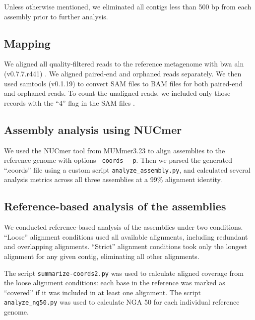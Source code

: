 \documentclass[11pt]{article}
\begin{document}
Unless otherwise mentioned, we eliminated all contigs less than 500 bp
from each assembly prior to further analysis.

\subsection*{Mapping}

We aligned all quality-filtered reads to the reference metagenome with
bwa aln (v0.7.7.r441) \cite{bwa}. We aligned paired-end and orphaned
reads separately. We then used samtools (v0.1.19)
\cite{sam-stools} to convert SAM files to BAM files for both
paired-end and orphaned reads. To count the unaligned reads, we
included only those records with the ``4'' flag in the SAM files
\cite{sam-stools}.
 
\subsection*{Assembly analysis using NUCmer}

We used the NUCmer tool from MUMmer3.23 \cite{mummer3.0} to align
assemblies to the reference genome with options {\tt \--coords} {\tt
  -p}. Then we parsed the generated ``.coords'' file using a custom
script {\tt{analyze\_assembly.py}}, and calculated several analysis
metrics across all three assemblies at a 99\% alignment identity.


\subsection*{Reference-based analysis of the assemblies}

We conducted reference-based analysis of the assemblies under two
conditions.  ``Loose'' alignment conditions used all available
alignments, including redundant and overlapping alignments. ``Strict''
alignment conditions took only the longest alignment for any given
contig, eliminating all other alignments.


The script {\tt summarize-coords2.py} was used to calculate aligned
coverage from the loose alignment conditions: each base in the reference
was marked as ``covered'' if it was included in at least one alignment.
The script {\tt analyze\_ng50.py} was used to calculate NGA 50 for
each individual reference genome.
\end{document}
